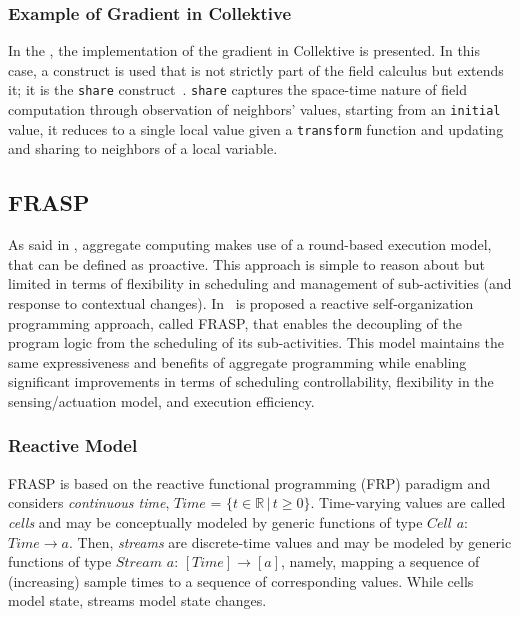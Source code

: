 \subsubsection{Example of Gradient in Collektive}

In the , the implementation of the gradient in Collektive is presented. In this case, a construct is used that is not strictly part of the field calculus but extends it; it is the \texttt{share} construct~\cite{https://doi.org/10.48550/arxiv.1910.02874}. \texttt{share} captures the space-time nature of field computation through observation of neighbors' values, starting from an \texttt{initial} value, it reduces to a single local value given a \texttt{transform} function and updating and sharing to neighbors of a local variable.



\subsection{FRASP}

As said in , aggregate computing makes use of a round-based execution model, that can be defined as proactive. This approach is simple to reason about but limited in terms of flexibility in scheduling and management of sub-activities (and response to contextual changes). In~\cite{Casadei2023} is proposed a reactive self-organization programming approach, called FRASP, that enables the decoupling of the program logic from the scheduling of its sub-activities. This model maintains the same expressiveness and benefits of aggregate programming while enabling significant improvements in terms of scheduling controllability, flexibility in the sensing/actuation model, and execution efficiency.

\subsubsection{Reactive Model}
FRASP is based on the reactive functional programming (FRP) paradigm and considers \textit{continuous time}, $Time$ = $\{ t \in \mathbb{R} \, | \, t \geq 0 \}$. Time-varying values are called \textit{cells} and may be conceptually modeled by generic functions of type $Cell$ $a$: $Time \rightarrow a$. Then, \textit{streams} are discrete-time values and may be modeled by generic functions of type $Stream$ $a$: $[Time] \rightarrow [a]$, namely, mapping a sequence of (increasing) sample times to a sequence of corresponding values. While cells model state, streams model state changes.

